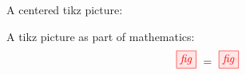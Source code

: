 \documentclass{article}
\begin{document}
A centered tikz picture:

A tikz picture as part of mathematics:
\begin{equation}
\tikzfig{fig} \ =\ 
\tikzfig{fig}
\end{equation}
\end{document}

